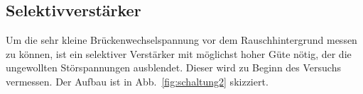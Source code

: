 \subsection{Selektivverstärker}
Um die sehr kleine Brückenwechselspannung vor dem Rauschhintergrund messen zu können, ist ein selektiver Verstärker mit möglichst hoher Güte nötig, der die ungewollten Störspannungen ausblendet. Dieser wird zu Beginn des Versuchs vermessen. Der Aufbau ist in Abb.~\ref{fig:schaltung2} skizziert.

